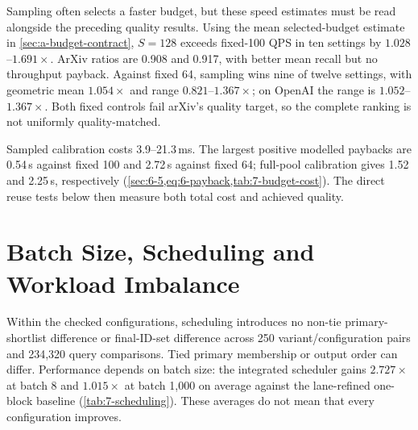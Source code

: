 Sampling often selects a faster budget, but these speed estimates must
be read alongside the preceding quality results. Using the mean
selected-budget estimate in \cref{sec:a-budget-contract}, $S=128$ exceeds
fixed-100 QPS in ten settings by $1.028$--$1.691\times$. ArXiv ratios
are 0.908 and 0.917, with better mean recall but no throughput payback.
Against fixed 64, sampling wins nine of twelve settings, with geometric
mean $1.054\times$ and range $0.821$--$1.367\times$; on OpenAI the range
is $1.052$--$1.367\times$. Both fixed controls fail arXiv's quality
target, so the complete ranking is not uniformly quality-matched.

\begin{table}[!htbp]
\centering
\caption[Sampled-calibration economics]{Calibration economics, $S=128$. Rates are kQPS and rule rate is
mean selected-budget QPS. Ratios compare with fixed 100 and fixed 64.
The ``Batches'' column gives payback relative to fixed 100 using 500
queries, or 499 for Stella; ``Never'' denotes no throughput payback.
The quality column separately marks whether fixed 100 meets the
held-out loss target.}
\label{tab:7-budget-cost}
\footnotesize\setlength{\tabcolsep}{3pt}

\end{table}

Sampled calibration costs 3.9--21.3\,ms. The largest positive modelled
paybacks are 0.54\,s against fixed 100 and 2.72\,s against fixed 64;
full-pool calibration gives 1.52 and 2.25\,s, respectively
(\cref{sec:6-5,eq:6-payback,tab:7-budget-cost}). The direct reuse tests
below then measure both total cost and achieved quality.



\section{Batch Size, Scheduling and Workload Imbalance}
\label{sec:7-6}

Within the checked configurations, scheduling introduces no non-tie
primary-shortlist difference or final-ID-set difference across
250 variant/configuration pairs and 234,320 query comparisons. Tied
primary membership or output order can differ. Performance depends on
batch size: the integrated scheduler gains $2.727\times$ at batch 8 and
$1.015\times$ at batch 1,000 on average against the lane-refined
one-block baseline (\cref{tab:7-scheduling}). These averages do not
mean that every configuration improves.

